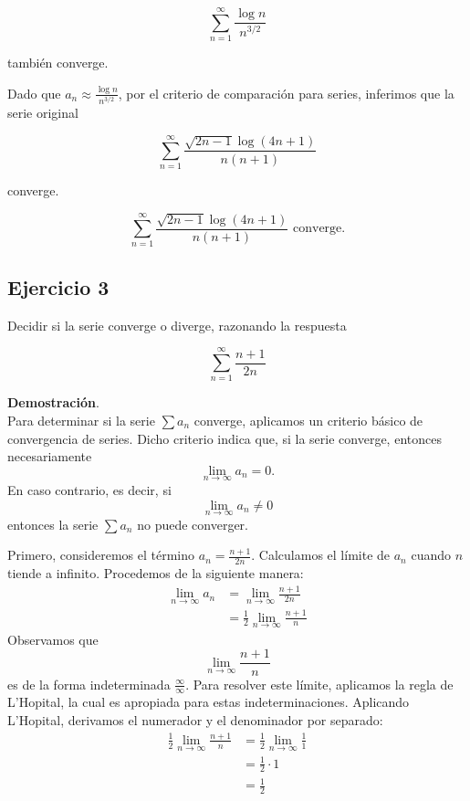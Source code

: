 \documentclass{article}
\begin{document}
    \[
    \sum_{n=1}^\infty \frac{\log n}{n^{3/2}}
    \]

    también converge.

    Dado que $a_n \approx \frac{\log n}{n^{3/2}}$, por el criterio de comparación para series, inferimos que la serie original

    \[
    \sum_{n=1}^\infty \frac{\sqrt{2 n-1} \log (4 n+1)}{n(n+1)}
    \]

    converge.

    \[
     \sum_{n=1}^{\infty} \frac{\sqrt{2 n-1} \log (4 n+1)}{n(n+1)} \text{ converge.}
    \]

    \subsection*{Ejercicio 3}

    Decidir si la serie converge o diverge, razonando la respuesta

    $$
    \sum_{n=1}^{\infty} \frac{n+1}{2 n}
    $$

    \textbf{Demostración}.\\

    Para determinar si la serie $\sum a_{n}$ converge, aplicamos un criterio básico de convergencia de series. Dicho criterio indica que, si la serie converge, entonces necesariamente
    \[
    \lim _{n \rightarrow \infty} a_{n} = 0.
    \]
    En caso contrario, es decir, si
    \[
    \lim _{n \rightarrow \infty} a_{n} \neq 0
    \]
    entonces la serie $\sum a_{n}$ no puede converger.

    Primero, consideremos el término $a_n = \frac{n+1}{2n}$. Calculamos el límite de $a_n$ cuando $n$ tiende a infinito. Procedemos de la siguiente manera:
    \begin{align*}
    \lim _{n \rightarrow \infty} a_{n} &= \lim _{n \rightarrow \infty} \frac{n+1}{2 n}\\
    &= \frac{1}{2} \lim _{n \rightarrow \infty} \frac{n+1}{n}
    \end{align*}
    Observamos que
    \[
    \lim _{n \rightarrow \infty} \frac{n+1}{n}
    \]
    es de la forma indeterminada \(\frac{\infty}{\infty}\). Para resolver este límite, aplicamos la regla de L'Hopital, la cual es apropiada para estas indeterminaciones. Aplicando L'Hopital, derivamos el numerador y el denominador por separado:
    \begin{align*}
    \frac{1}{2} \lim _{n \rightarrow \infty} \frac{n+1}{n} &= \frac{1}{2} \lim _{n \rightarrow \infty} \frac{1}{1} \\
    &= \frac{1}{2} \cdot 1 \\
    &= \frac{1}{2}
    \end{align*}
\end{document}
